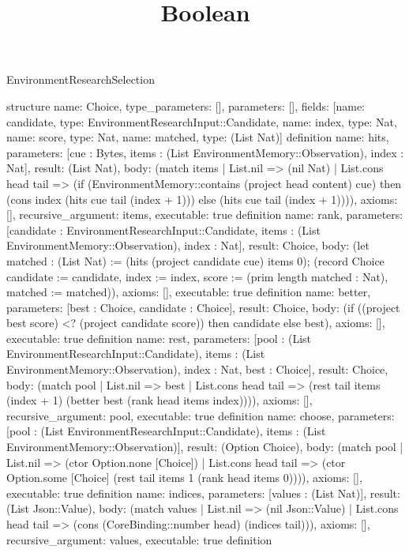 \begin{lexlean}{EnvironmentResearchSelection}
\title{Boolean}
\begin{semanticmodule}
structure{
 name: Choice, type_parameters: [], parameters: [],
 fields: [{name: candidate, type: EnvironmentResearchInput::Candidate}, {name: index, type: Nat}, {name: score, type: Nat}, {name: matched, type: (List Nat)}]
}
definition{
 name: hits, parameters: [cue : Bytes, items : (List EnvironmentMemory::Observation), index : Nat], result: (List Nat),
 body: (match items | List.nil => (nil Nat) | List.cons head tail => (if (EnvironmentMemory::contains (project head content) cue) then (cons index (hits cue tail (index + 1))) else (hits cue tail (index + 1)))),
 axioms: [], recursive_argument: items, executable: true
}
definition{
 name: rank, parameters: [candidate : EnvironmentResearchInput::Candidate, items : (List EnvironmentMemory::Observation), index : Nat], result: Choice,
 body: (let matched : (List Nat) := (hits (project candidate cue) items 0); (record Choice {candidate := candidate, index := index, score := (prim length matched : Nat), matched := matched})),
 axioms: [], executable: true
}
definition{
 name: better, parameters: [best : Choice, candidate : Choice], result: Choice,
 body: (if ((project best score) <? (project candidate score)) then candidate else best),
 axioms: [], executable: true
}
definition{
 name: rest, parameters: [pool : (List EnvironmentResearchInput::Candidate), items : (List EnvironmentMemory::Observation), index : Nat, best : Choice], result: Choice,
 body: (match pool | List.nil => best | List.cons head tail => (rest tail items (index + 1) (better best (rank head items index)))),
 axioms: [], recursive_argument: pool, executable: true
}
definition{
 name: choose, parameters: [pool : (List EnvironmentResearchInput::Candidate), items : (List EnvironmentMemory::Observation)], result: (Option Choice),
 body: (match pool | List.nil => (ctor Option.none [Choice]) | List.cons head tail => (ctor Option.some [Choice] (rest tail items 1 (rank head items 0)))),
 axioms: [], executable: true
}
definition{
 name: indices, parameters: [values : (List Nat)], result: (List Json::Value),
 body: (match values | List.nil => (nil Json::Value) | List.cons head tail => (cons (CoreBinding::number head) (indices tail))),
 axioms: [], recursive_argument: values, executable: true
}
definition{
}
\end{semanticmodule}
\end{lexlean}
